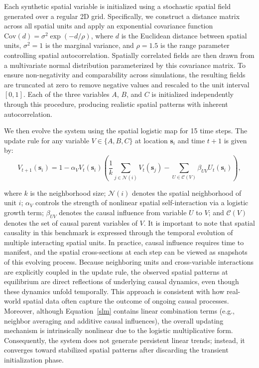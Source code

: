 \documentclass[authoryear,preprint,review,12pt]{elsarticle}
\begin{document}
Each synthetic spatial variable is initialized using a stochastic spatial field generated over a regular 2D grid. Specifically, we construct a distance matrix across all spatial units and apply an exponential covariance function \(\text{Cov}(d) = \sigma^2 \exp(-d / \rho)\), where \(d\) is the Euclidean distance between spatial units, \(\sigma^2 = 1\) is the marginal variance, and \(\rho = 1.5\) is the range parameter controlling spatial autocorrelation. Spatially correlated fields are then drawn from a multivariate normal distribution parameterized by this covariance matrix. To ensure non-negativity and comparability across simulations, the resulting fields are truncated at zero to remove negative values and rescaled to the unit interval \([0,1]\). Each of the three variables \(A\), \(B\), and \(C\) is initialized independently through this procedure, producing realistic spatial patterns with inherent autocorrelation.

We then evolve the system using the spatial logistic map for 15 time steps. The update rule for any variable \(V \in \{A, B, C\}\) at location \(\mathbf{s}_i\) and time \(t+1\) is given by:
\begin{equation}\label{slm}
V_{t+1}(\mathbf{s}_i) = 1 - \alpha_V V_t(\mathbf{s}_i)\left(\frac{1}{k}\sum_{j\in \mathcal{N}(i)} V_t(\mathbf{s}_j) - \sum_{U\in \mathcal{C}(V)}\beta_{UV} U_t(\mathbf{s}_i)\right),
\end{equation}

\noindent where \(k\) is the neighborhood size; \(\mathcal{N}(i)\) denotes the spatial neighborhood of unit \(i\); \(\alpha_V\) controls the strength of nonlinear spatial self-interaction via a logistic growth term; \(\beta_{UV}\) denotes the causal influence from variable \(U\) to \(V\); and \(\mathcal{C}(V)\) denotes the set of causal parent variables of \(V\). It is important to note that spatial causality in this benchmark is expressed through the temporal evolution of multiple interacting spatial units. In practice, causal influence requires time to manifest, and the spatial cross-sections at each step can be viewed as snapshots of this evolving process. Because neighboring units and cross-variable interactions are explicitly coupled in the update rule, the observed spatial patterns at equilibrium are direct reflections of underlying causal dynamics, even though these dynamics unfold temporally. This approach is consistent with how real-world spatial data often capture the outcome of ongoing causal processes. Moreover, although Equation~\ref{slm} contains linear combination terms (e.g., neighbor averaging and additive causal influences), the overall updating mechanism is intrinsically nonlinear due to the logistic multiplicative form. Consequently, the system does not generate persistent linear trends; instead, it converges toward stabilized spatial patterns after discarding the transient initialization phase.
\end{document}
